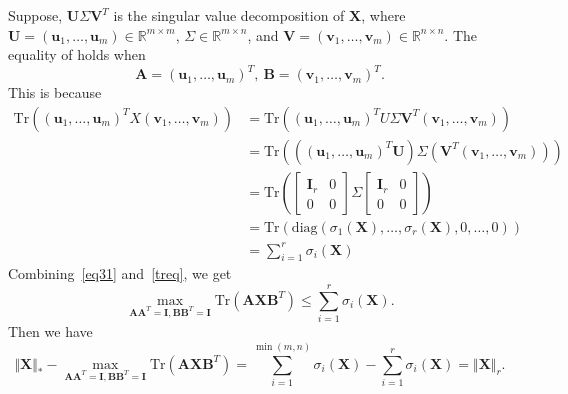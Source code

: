 \documentclass[fontset=windows]{article}
\begin{document}
{Suppose, $\mathbf U\mathbf \varSigma\mathbf V^T$ is the singular value decomposition of $\mathbf X$, where $\mathbf U = (\mathbf u_1,\dots,\mathbf u_m) \in \mathbb{R}^{m \times m}$, $\mathbf \varSigma \in \mathbb{R}^{m \times n}$, and $\mathbf V = (\mathbf v_1,\dots,\mathbf v_m) \in \mathbb{R}^{n \times n}$. The equality of holds when 
\begin{equation}
    \mathbf A = (\mathbf u_1,\dots,\mathbf u_m)^T, \ \mathbf B = (\mathbf v_1,\dots,\mathbf v_m)^T.
    \label{}
\end{equation}
This is because
\begin{equation}
    \begin{aligned}
        \text{Tr} ((\mathbf u_1,\dots,\mathbf u_m)^TX(\mathbf v_1,\dots,\mathbf v_m))
        & = \text{Tr} ((\mathbf u_1,\dots,\mathbf u_m)^TU\mathbf \varSigma\mathbf V^T(\mathbf v_1,\dots,\mathbf v_m)) \\
        & = \text{Tr} (((\mathbf u_1,\dots,\mathbf u_m)^T\mathbf U) \mathbf \varSigma (\mathbf V^T(\mathbf v_1,\dots,\mathbf v_m))) \\
        & = \text{Tr} \left( \begin{bmatrix}
            \mathbf I_r & 0\\
            0 & 0 
        \end{bmatrix} \Sigma \begin{bmatrix}
            \mathbf I_r & 0\\
            0 & 0 
        \end{bmatrix}
        \right) \\
        & = \text{Tr}(\text{diag}(\sigma_1(\mathbf X),\dots,\sigma_r(\mathbf X),0,\dots,0)) \\
        & = \sum_{i=1}^r \sigma_i(\mathbf X)	
    \end{aligned}
    \label{treq}
\end{equation}
Combining~\eqref{eq31} and~\eqref{treq}, we get
\begin{equation}
    \underset{\mathbf A\mathbf A^T=\mathbf I,\mathbf B\mathbf B^T=\mathbf I}{\max} \text{Tr}(\mathbf A\mathbf X\mathbf B^T) \leq \sum_{i=1}^r \sigma_i(\mathbf X).
\end{equation}
Then we have 
\begin{equation}
    \Vert\mathbf X \Vert_* - \underset{\mathbf A\mathbf A^T=\mathbf I,\mathbf B\mathbf B^T=\mathbf I}{\max} \text{Tr}(\mathbf A\mathbf X\mathbf B^T)  
        = \sum_{i=1}^{\min(m,n)} \sigma_i(\mathbf X) - \sum_{i=1}^r \sigma_i(\mathbf X) 
        = \Vert\mathbf X \Vert_r.

\end{equation}}
\end{document}
